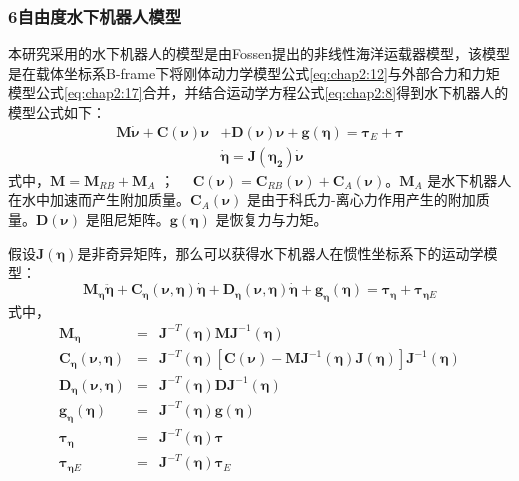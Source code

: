 \subsubsection{6自由度水下机器人模型 }

本研究采用的水下机器人的模型是由Fossen提出的非线性海洋运载器模型，该模型是在载体坐标系B-frame下将刚体动力学模型公式\ref{eq:chap2:12}与外部合力和力矩模型公式\ref{eq:chap2:17}合并，并结合运动学方程公式\ref{eq:chap2:8}得到水下机器人的模型公式如下\cite{fossen1994guidance}：
\begin{equation}
\label{eq:chap2:30}
\begin{aligned}
\bm{M} \dot {\bm{\nu}} + \bm{C}(\bm{\nu}) \bm{\nu}&
+ \bm{D}(\bm{\nu}) \bm{\nu} + \bm{g}(\bm{\eta}) = \bm{\tau}_E +  \bm{\tau}\\
&\dot{\bm{\eta}}= \bm{J(\bm{\eta}_2)}   \dot{\bm{\nu}}
\end{aligned}
\end{equation}
式中，$\bm{M} = \bm{M}_{RB} +\bm{M}_A$ ； $\quad \bm{C}(\bm{\nu}) =  \bm{C}_{RB}(\bm{\nu}) +  \bm{C}_{A}(\bm{\nu})$。$\bm{M}_A $ 是水下机器人在水中加速而产生附加质量。$\bm{C}_{A}(\bm{\nu})$ 是由于科氏力-离心力作用产生的附加质量。$\bm{D}(\bm{\nu})$ 是阻尼矩阵。$\bm{g}(\bm{\eta})$ 是恢复力与力矩。

假设$\bm{J}(\bm{\eta})$是非奇异矩阵，那么可以获得水下机器人在惯性坐标系下的运动学模型：
\begin{equation}
\label{eq:chap2:31}
\bm{M}_{\bm{\eta}}{\ddot {\bm{\eta}}} +\bm{C}_{\bm{\eta}}(\bm{\nu},\bm{\eta}) {\dot {\bm{\eta}}} + \bm{D}_{\bm{\eta}} (\bm{\nu},\bm{\eta}) {\dot {\bm{\eta}} }+\bm{g}_{\bm{\eta}}(\bm{\eta}) = \bm{\tau}_{\bm{\eta}}+\bm{\tau}_{\bm{\eta}E}
\end{equation}
式中，
\begin{eqnarray}
\label{eq:chap2:32}
\bm{M}_{\bm{\eta}} &=& \bm{J}^{-T}(\bm{\eta})\bm{M}\bm{J}^{-1}(\bm{\eta})\\
\bm{C}_{\bm{\eta}}(\bm{\nu},\bm{\eta}) &=& \bm{J}^{-T}(\bm{\eta})[\bm{C}(\bm{\nu})-\bm{M}\bm{J}^{-1}(\bm{\eta})\bm{J}(\bm{\eta})] \bm{J}^{-1}(\bm{\eta})\\
\bm{D}_{\bm{\eta}} (\bm{\nu},\bm{\eta})&=& \bm{J}^{-T}(\bm{\eta})\bm{D}\bm{J}^{-1}(\bm{\eta})  \\
\bm{g}_{\bm{\eta}}(\bm{\eta}) &=& \bm{J}^{-T}(\bm{\eta}) \bm{g}(\bm{\eta})  \\
\bm{\tau}_{\bm{\eta}} &=& \bm{J}^{-T}(\bm{\eta}) \bm{\tau}\\
\bm{\tau}_{\bm{\eta}E} &=& \bm{J}^{-T}(\bm{\eta})\bm{\tau}_{E}
\end{eqnarray}


